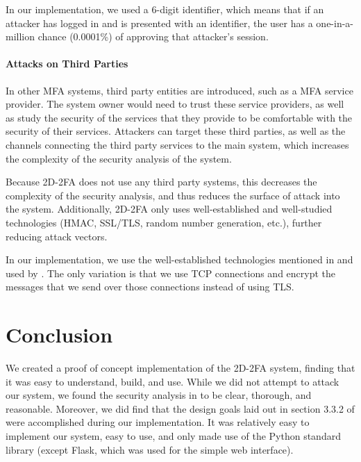 \documentclass[11pt]{article} %
\begin{document}
In our implementation, we used a 6-digit identifier, which means that if
an attacker has logged in and is presented with an identifier, the user
has a one-in-a-million chance (0.0001\%) of approving that attacker's
session. 

\paragraph{Attacks on Third Parties}
In other MFA systems, third party entities are introduced, such as a MFA
service provider. The system owner would need to trust these service
providers, as well as study the security of the services that they
provide to be comfortable with the security of their services. Attackers
can target these third parties, as well as the channels connecting the
third party services to the main system, which increases the complexity
of the security analysis of the system. 

Because 2D-2FA does not use any third party systems, this decreases the
complexity of the security analysis, and thus reduces the surface of
attack into the system. Additionally, 2D-2FA only uses well-established
and well-studied technologies (HMAC, SSL/TLS, random number generation,
etc.), further reducing attack vectors.

In our implementation, we use the well-established technologies
mentioned in and used by \cite{shirvanian2d2fa}. The only variation is
that we use TCP connections and encrypt the messages
that we send over those connections instead of using TLS.

\section{Conclusion}

We created a proof of concept implementation of the 2D-2FA system,
finding that it was easy to understand, build, and use. While we did not
attempt to attack our system, we found the security analysis in
\cite{shirvanian2d2fa} to be clear, thorough, and reasonable. Moreover,
we did find that the design goals laid out in section 3.3.2 of
\cite{shirvanian2d2fa} were accomplished during our implementation. It
was relatively easy to implement our system, easy to use, and only made
use of the Python standard library (except Flask, which was used for the
simple web interface). 

\end{document}
